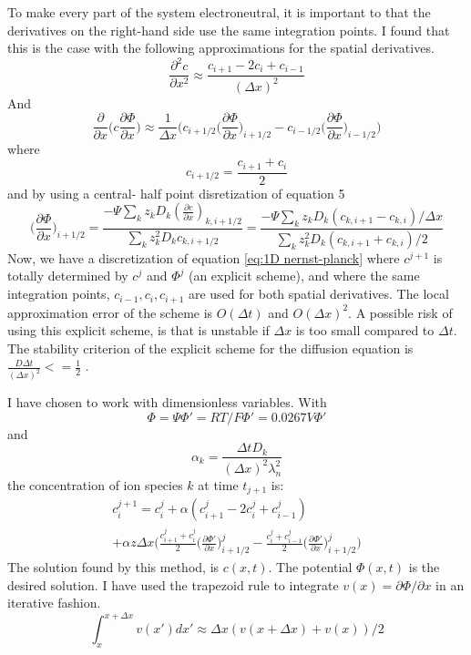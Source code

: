 \documentclass{article}
\begin{document}
To make every part of the system electroneutral, it is important to that the derivatives on the right-hand side use the same integration points. I found that this is the case with the following approximations for the spatial derivatives. 
$$\frac{\partial^2 c}{\partial x^2} \approx \frac{c_{i+1}-2c_i+c_{i-1}}{(\Delta x)^2}$$
And 
$$\frac{\partial }{\partial x}  \bigg(c \frac{\partial \Phi}{\partial x} \bigg)\approx \frac{1}{\Delta x}\bigg( c_{i+1/2} \big(\frac{\partial \Phi}{\partial x}\big)_{i+1/2} -  c_{i-1/2} \big(\frac{\partial \Phi}{\partial x}\big)_{i-1/2} \bigg) $$
where 
$$c_{i+ 1/2} = \frac{c_{i+1}+ c_i}{2}$$
and by using a central- half point disretization of equation 5
\begin{equation}\label{eq:gradPhi}
\big(\frac{\partial \Phi}{\partial x}\big)_{i+1/2} = \frac{-\Psi \sum_k z_k D_k (\frac{\partial c}{\partial x})_{k,i+1/2}}{\sum_k z_k^2 D_k c_{k,i+1/2}}= \frac{-\Psi \sum_k z_k D_k (c_{k,i+1}-c_{k,i})/\Delta x }{\sum_k z_k^2 D_k (c_{k,i+1}+c_{k,i})/2}
\end{equation}
Now, we have a discretization of equation \ref{eq:1D nernst-planck} where $c^{j+1}$ is totally determined by $c^j$ and $\Phi^j$ (an explicit scheme), and where the same integration points, $c_{i-1}, c_i, c_{i+1}$ are used for both spatial derivatives. The local approximation error of the scheme is $O(\Delta t)$ and $O(\Delta x)^2$. A possible risk of using this explicit scheme, is that is unstable if $\Delta x$ is too small compared to $\Delta t$. The stability criterion of the explicit scheme for the diffusion equation is $\frac{D\Delta t}{(\Delta x)^2} <= \frac{1}{2}$ \cite{lecturenotes}.

I have chosen to work with dimensionless variables. With $$\Phi = \Psi\Phi' = RT/F\Phi' = 0.0267V \Phi'$$ and $$\alpha_k = \frac{\Delta t D_k}{(\Delta x)^2 \lambda_n^2}$$ the concentration of ion species $k$ at time $t_{j+1}$ is:
\begin{multline}\label{eq:c_i+1}
 c_i^{j+1}= c_i^j + \alpha(c_{i+1}^j-2c_i^j+c_{i-1}^j)\\ + \alpha z\Delta x \bigg(\frac{c_{i+1}^j+c_i^j}{2} \big(\frac{\partial \Phi'}{\partial x}\big)_{i+1/2}^j-\frac{c_{i}^j+c_{i-1}^j}{2} \big(\frac{\partial \Phi'}{\partial x}\big)_{i+1/2}^j\bigg)
\end{multline}
The solution found by this method, is $c(x,t)$. The potential $\Phi(x,t)$ is the desired solution. I have used the trapezoid rule to integrate $v(x) =\partial \Phi / \partial x$ in an iterative fashion.
\begin{equation}
\int_x^{x+\Delta x}v(x') dx'  \approx \Delta x ( v(x+\Delta x) + v(x) )/2
\end{equation}
\end{document}
